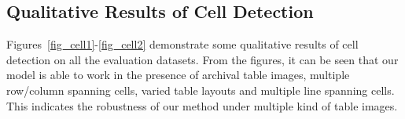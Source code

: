 \documentclass[runningheads]{llncs}
\begin{document}
\newpage
\subsection*{Qualitative Results of Cell Detection}

Figures~\ref{fig_cell1}-\ref{fig_cell2} demonstrate some qualitative results of cell detection on all the evaluation datasets. From the figures, it can be seen that our model is able to work in the presence of archival table images, multiple row/column spanning cells, varied table layouts and multiple line spanning cells. This indicates the robustness of our method under multiple kind of table images.
\begin{figure}[ht!]
\begin{center}
\hspace{-0.01\textwidth}
\hspace{-0.01\textwidth}
\vspace{0.001\textwidth}
\hspace{-0.01\textwidth}
\hspace{-0.01\textwidth}
\vspace{0.001\textwidth}
\hspace{-0.01\textwidth}
\hspace{-0.01\textwidth}
\vspace{0.001\textwidth}
\hspace{-0.01\textwidth}
\hspace{-0.01\textwidth}

\end{center}
\end{figure}
\end{document}
